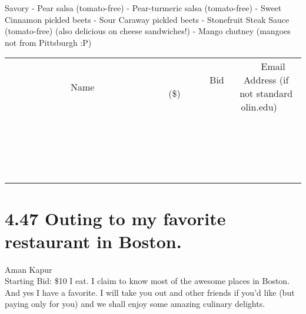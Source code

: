 \documentclass[11pt]{article}
\begin{document}
Savory
- Pear salsa (tomato-free)
- Pear-turmeric salsa (tomato-free)
- Sweet Cinnamon pickled beets
- Sour Caraway pickled beets
- Stonefruit Steak Sauce (tomato-free) (also delicious on cheese sandwiches!)
- Mango chutney (mangoes not from Pittsburgh :P)
\\[3ex]
\begin{tabular}{c c c}
~~~~~~~~~~~~~Name~~~~~~~~~~~~~ & ~~~~~~~~~Bid (\$)~~~~~~~~~  & ~~~Email Address (if not standard olin.edu)~~~\\
 & & \\
\hline
 & & \\
\hline
 & & \\
\hline
 & & \\
\hline
 & & \\
\hline
 & & \\
\hline
 & & \\
\hline
 & & \\
\hline
 & & \\
\hline
 & & \\
\hline
 & & \\
\hline
 & & \\
\hline
 & & \\
\hline
 & & \\
\hline
 & & \\
\hline
 & & \\
\hline
 & & \\
\hline
 & & \\
\hline
 & & \\
\hline
\end{tabular}
\newpage
\section*{4.47 Outing to my favorite restaurant in Boston. }
Aman Kapur
\\
Starting Bid: \$10
\newline
I eat. I claim to know most of the awesome places in Boston. And yes I have a favorite. I will take you out and other friends if you'd like (but paying only for you) and we shall enjoy some amazing culinary delights. 
\end{document}
